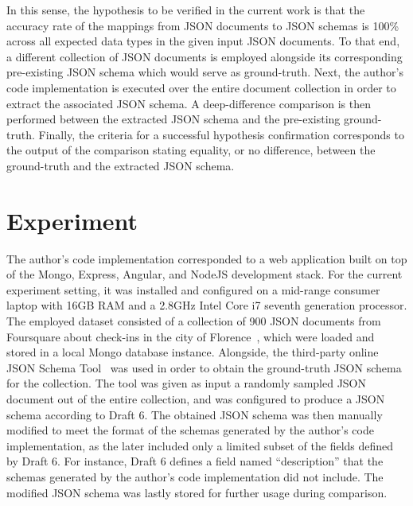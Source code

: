 \documentclass[sigconf, nonacm]{acmart}
\begin{document}
In this sense, the hypothesis to be verified in the current work is that the accuracy rate of the mappings from JSON documents to JSON schemas is 100\% across all expected data types in the given input JSON documents. To that end, a different collection of JSON documents is employed alongside its corresponding pre-existing JSON schema which would serve as ground-truth. Next, the author's code implementation is executed over the entire document collection in order to extract the associated JSON schema. A deep-difference comparison is then performed between the extracted JSON schema and the pre-existing ground-truth. Finally, the criteria for a successful hypothesis confirmation corresponds to the output of the comparison stating equality, or no difference, between the ground-truth and the extracted JSON schema.

\section{Experiment}

The author's code implementation corresponded to a web application built on top of the Mongo, Express, Angular, and NodeJS development stack. For the current experiment setting, it was installed and configured on a mid-range consumer laptop with 16GB RAM and a 2.8GHz Intel Core i7 seventh generation processor. The employed dataset consisted of a collection of 900 JSON documents from Foursquare about check-ins in the city of Florence~\cite{emre2017}, which were loaded and stored in a local Mongo database instance. Alongside, the third-party online JSON Schema Tool~\cite{schemagen} was used in order to obtain the ground-truth JSON schema for the collection. The tool was given as input a randomly sampled JSON document out of the entire collection, and was configured to produce a JSON schema according to Draft 6. The obtained JSON schema was then manually modified to meet the format of the schemas generated by the author's code implementation, as the later included only a limited subset of the fields defined by Draft 6. For instance, Draft 6 defines a field named ``description'' that the schemas generated by the author's code implementation did not include. The modified JSON schema was lastly stored for further usage during comparison.

\end{document}
